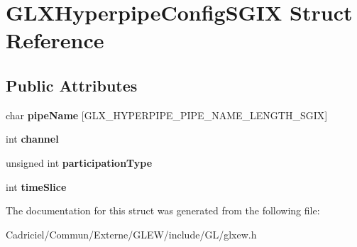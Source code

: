 \hypertarget{struct_g_l_x_hyperpipe_config_s_g_i_x}{\section{G\-L\-X\-Hyperpipe\-Config\-S\-G\-I\-X Struct Reference}
\label{struct_g_l_x_hyperpipe_config_s_g_i_x}
}
\subsection*{Public Attributes}
\begin{DoxyCompactItemize}
\item 
\hypertarget{struct_g_l_x_hyperpipe_config_s_g_i_x_a9e3748f92005cac81cb44d4c67acccb8}{char {\bfseries pipe\-Name} \mbox{[}G\-L\-X\-\_\-\-H\-Y\-P\-E\-R\-P\-I\-P\-E\-\_\-\-P\-I\-P\-E\-\_\-\-N\-A\-M\-E\-\_\-\-L\-E\-N\-G\-T\-H\-\_\-\-S\-G\-I\-X\mbox{]}}\label{struct_g_l_x_hyperpipe_config_s_g_i_x_a9e3748f92005cac81cb44d4c67acccb8}

\item 
\hypertarget{struct_g_l_x_hyperpipe_config_s_g_i_x_abc812d8796ba89d5de4e33b3532d8335}{int {\bfseries channel}}\label{struct_g_l_x_hyperpipe_config_s_g_i_x_abc812d8796ba89d5de4e33b3532d8335}

\item 
\hypertarget{struct_g_l_x_hyperpipe_config_s_g_i_x_a093cfaaec305531f66e1120929b5b01b}{unsigned int {\bfseries participation\-Type}}\label{struct_g_l_x_hyperpipe_config_s_g_i_x_a093cfaaec305531f66e1120929b5b01b}

\item 
\hypertarget{struct_g_l_x_hyperpipe_config_s_g_i_x_afe9288e75dc1ae5e0f33eff978d7024d}{int {\bfseries time\-Slice}}\label{struct_g_l_x_hyperpipe_config_s_g_i_x_afe9288e75dc1ae5e0f33eff978d7024d}

\end{DoxyCompactItemize}


The documentation for this struct was generated from the following file\-:\begin{DoxyCompactItemize}
\item 
Cadriciel/\-Commun/\-Externe/\-G\-L\-E\-W/include/\-G\-L/glxew.\-h\end{DoxyCompactItemize}
